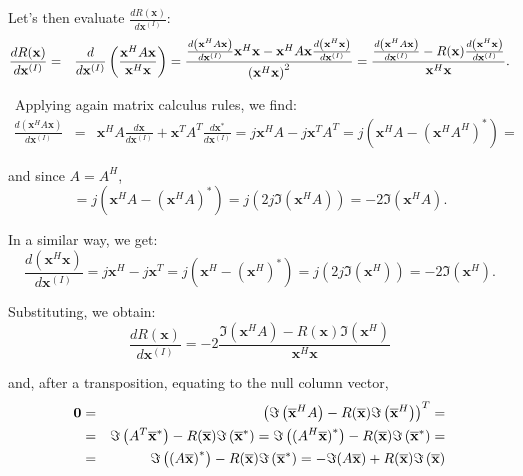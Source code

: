 \documentclass[12pt]{article}
\begin{document}
Let's then evaluate $\frac{dR(\mathbf{x})}{d\mathbf{x}^{(I)}}$:%
\begin{eqnarray*}
\frac{dR(\mathbf{x})}{d\mathbf{x}^{(I)}} &=&\frac{d}{d\mathbf{x}^{(I)}}%
\left( \frac{\mathbf{x}^{H}A\mathbf{x}}{\mathbf{x}^{H}\mathbf{x}}\right) =%
\frac{\frac{d\left( \mathbf{x}^{H}A\mathbf{x}\right) }{d\mathbf{x}^{(I)}}%
\mathbf{x}^{H}\mathbf{x-x}^{H}A\mathbf{x}\frac{d\left( \mathbf{x}^{H}\mathbf{%
x}\right) }{d\mathbf{x}^{(I)}}}{\left( \mathbf{x}^{H}\mathbf{x}\right) ^{2}}=
\frac{\frac{d\left( \mathbf{x}^{H}A\mathbf{x}\right) }{d\mathbf{x}^{(I)}}%
-R(\mathbf{x})\frac{d\left( \mathbf{x}^{H}\mathbf{x}\right) }{d\mathbf{x}%
^{(I)}}}{\mathbf{x}^{H}\mathbf{x}}\text{.}
\end{eqnarray*}

\ Applying again matrix calculus rules, we find:
\begin{eqnarray*}
\frac{d\left( \mathbf{x}^{H}A\mathbf{x}\right) }{d\mathbf{x}^{(I)}} &=&%
\mathbf{x}^{H}A\frac{d\mathbf{x}}{d\mathbf{x}^{(I)}}+\mathbf{x}^{T}A^{T}\frac{d\mathbf{x}^{\ast }}{d\mathbf{x}^{(I)}}=j\mathbf{x}^{H}A-j\mathbf{x}^{T}A^{T}=j(\mathbf{x}^{H}A-\left( \mathbf{x}^{H}A^{H}\right) ^{\ast })=
\end{eqnarray*}

and since $A=A^{H}$,
\begin{equation*}
=j(\mathbf{x}^{H}A-\left( \mathbf{x}^{H}A\right) ^{\ast })=j(2j\Im\left( \mathbf{x}^{H}A\right) )=-2\Im\left( \mathbf{x}^{H}A\right) 
\text{.}
\end{equation*}

In a similar way, we get:
\begin{equation*}
\frac{d\left( \mathbf{x}^{H}\mathbf{x}\right) }{d\mathbf{x}^{(I)}}=j\mathbf{x}^{H}-j\mathbf{x}^{T}=j(\mathbf{x}^{H}-\left( \mathbf{x}^{H}\right) ^{\ast
})=j(2j\Im(\mathbf{x}^{H}))=-2\Im\left( \mathbf{x}^{H}\right) 
\text{.}
\end{equation*}

Substituting, we obtain:%
\begin{equation*}
\frac{dR(\mathbf{x})}{d\mathbf{x}^{(I)}}=-2\frac{\Im\left( \mathbf{x}^{H}A\right) -R(\mathbf{x})\Im\left( \mathbf{x}^{H}\right) }{\mathbf{x}^{H}\mathbf{x}}
\end{equation*}

and, after a transposition, equating to the null column vector,%
\begin{eqnarray*}
\mathbf{0} &=&\left( \Im\left( \overline{\mathbf{x}}^{H}A\right) -R(%
\overline{\mathbf{x}})\Im\left( \overline{\mathbf{x}}^{H}\right)
\right) ^{T}= \\
&=&\Im\left( A^{T}\overline{\mathbf{x}}^{\ast }\right) -R(\overline{%
\mathbf{x}})\Im\left( \overline{\mathbf{x}}^{\ast }\right) =\Im%
\left( (A^{H}\overline{\mathbf{x}}\mathbf{)}^{\ast }\right) -R(\overline{%
\mathbf{x}})\Im\left( \overline{\mathbf{x}}^{\ast }\right) = \\
&=&\Im\left( (A\overline{\mathbf{x}}\mathbf{)}^{\ast }\right) -R(%
\overline{\mathbf{x}})\Im\left( \overline{\mathbf{x}}^{\ast }\right) =-%
\Im(A\overline{\mathbf{x}}\mathbf{)}+R(\overline{\mathbf{x}})\Im%
\left( \overline{\mathbf{x}}\right)
\end{eqnarray*}
\end{document}
